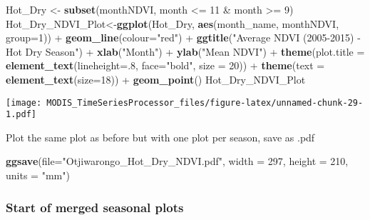 \documentclass[]{article}
\newenvironment{Shaded}{\begin{snugshade}}{\end{snugshade}}
\newcommand{\KeywordTok}[1]{\textcolor[rgb]{0.13,0.29,0.53}{\textbf{{#1}}}}
\newcommand{\DataTypeTok}[1]{\textcolor[rgb]{0.13,0.29,0.53}{{#1}}}
\newcommand{\DecValTok}[1]{\textcolor[rgb]{0.00,0.00,0.81}{{#1}}}
\newcommand{\StringTok}[1]{\textcolor[rgb]{0.31,0.60,0.02}{{#1}}}
\newcommand{\NormalTok}[1]{{#1}}
\begin{document}
\begin{Shaded}
\begin{Highlighting}[]
\NormalTok{Hot_Dry <-}\StringTok{ }\KeywordTok{subset}\NormalTok{(monthNDVI, month <=}\StringTok{ }\DecValTok{11} \NormalTok{&}\StringTok{ }\NormalTok{month >=}\StringTok{ }\DecValTok{9}\NormalTok{)}
\NormalTok{Hot_Dry_NDVI_Plot<-}\KeywordTok{ggplot}\NormalTok{(Hot_Dry, }\KeywordTok{aes}\NormalTok{(month_name, monthNDVI, }\DataTypeTok{group=}\DecValTok{1}\NormalTok{)) +}
\StringTok{  }\KeywordTok{geom_line}\NormalTok{(}\DataTypeTok{colour=}\StringTok{"red"}\NormalTok{) +}
\StringTok{  }\KeywordTok{ggtitle}\NormalTok{(}\StringTok{"Average NDVI (2005-2015) - Hot Dry Season"}\NormalTok{) +}
\StringTok{  }\KeywordTok{xlab}\NormalTok{(}\StringTok{"Month"}\NormalTok{) +}\StringTok{ }\KeywordTok{ylab}\NormalTok{(}\StringTok{"Mean NDVI"}\NormalTok{) +}
\StringTok{  }\KeywordTok{theme}\NormalTok{(}\DataTypeTok{plot.title =} \KeywordTok{element_text}\NormalTok{(}\DataTypeTok{lineheight=}\NormalTok{.}\DecValTok{8}\NormalTok{, }\DataTypeTok{face=}\StringTok{"bold"}\NormalTok{,}
                                  \DataTypeTok{size =} \DecValTok{20}\NormalTok{)) +}
\StringTok{  }\KeywordTok{theme}\NormalTok{(}\DataTypeTok{text =} \KeywordTok{element_text}\NormalTok{(}\DataTypeTok{size=}\DecValTok{18}\NormalTok{)) +}\StringTok{ }\KeywordTok{geom_point}\NormalTok{()}
\NormalTok{Hot_Dry_NDVI_Plot}
\end{Highlighting}
\end{Shaded}

\texttt{[image: MODIS\_TimeSeriesProcessor\_files/figure-latex/unnamed-chunk-29-1.pdf]}

Plot the same plot as before but with one plot per season, save as .pdf

\begin{Shaded}
\begin{Highlighting}[]
\KeywordTok{ggsave}\NormalTok{(}\DataTypeTok{file=}\StringTok{"Otjiwarongo_Hot_Dry_NDVI.pdf"}\NormalTok{, }\DataTypeTok{width =} \DecValTok{297}\NormalTok{, }\DataTypeTok{height =} \DecValTok{210}\NormalTok{, }\DataTypeTok{units =} 
         \StringTok{"mm"}\NormalTok{)}
\end{Highlighting}
\end{Shaded}

\subsubsection{Start of merged seasonal
plots}\label{start-of-merged-seasonal-plots}
\end{document}
